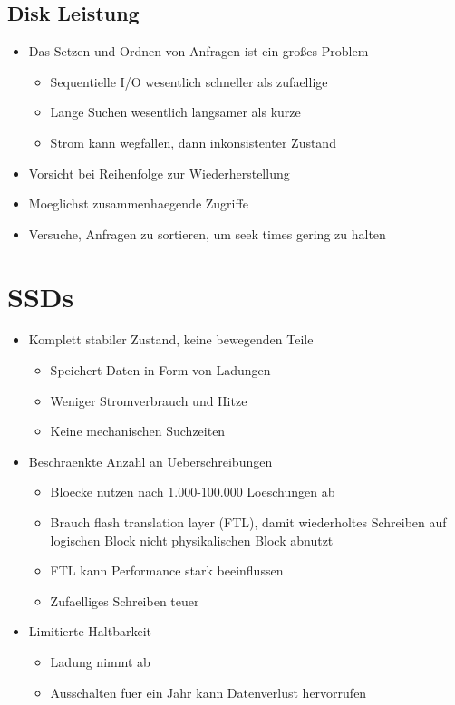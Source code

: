 \documentclass[a4paper]{scrreprt}
\begin{document}
\subsection{Disk Leistung}
\begin{itemize}
	\item Das Setzen und Ordnen von Anfragen ist ein großes Problem
		\begin{itemize}
			\item Sequentielle I/O wesentlich schneller als zufaellige
			\item Lange Suchen wesentlich langsamer als kurze
			\item Strom kann wegfallen, dann inkonsistenter Zustand
		\end{itemize}
	\item Vorsicht bei Reihenfolge zur Wiederherstellung
	\item Moeglichst zusammenhaegende Zugriffe
	\item Versuche, Anfragen zu sortieren, um seek times gering zu halten
\end{itemize}

\section{SSDs}
\begin{itemize}
	\item Komplett stabiler Zustand, keine bewegenden Teile
		\begin{itemize}
			\item Speichert Daten in Form von Ladungen
			\item Weniger Stromverbrauch und Hitze
			\item Keine mechanischen Suchzeiten
		\end{itemize}
	\item Beschraenkte Anzahl an Ueberschreibungen
		\begin{itemize}
			\item Bloecke nutzen nach 1.000-100.000 Loeschungen ab
			\item Brauch flash translation layer (FTL), damit wiederholtes Schreiben auf logischen Block nicht physikalischen Block abnutzt
			\item FTL kann Performance stark beeinflussen
			\item Zufaelliges Schreiben teuer
		\end{itemize}
	\item Limitierte Haltbarkeit
		\begin{itemize}
			\item Ladung nimmt ab
			\item Ausschalten fuer ein Jahr kann Datenverlust hervorrufen
		\end{itemize}
\end{itemize}
\end{document}
